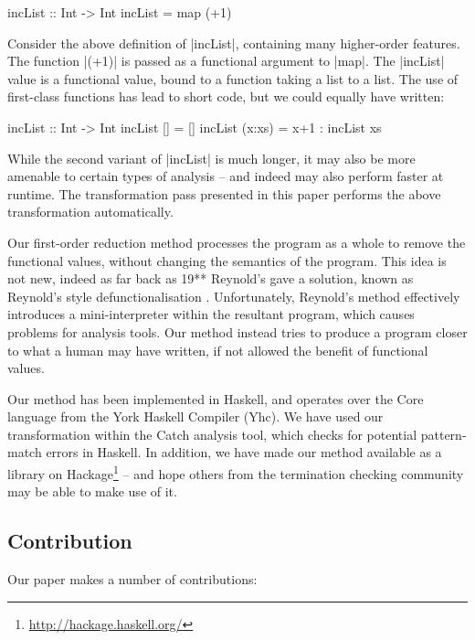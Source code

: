 \documentclass[preprint]{sigplanconf}
\begin{document}
\begin{example}
\label{ex:incList}
\begin{code}
incList :: Int -> Int
incList = map (+1)
\end{code}

Consider the above definition of |incList|, containing many higher-order features. The function |(+1)| is passed as a functional argument to |map|. The |incList| value is a functional value, bound to a function taking a list to a list. The use of first-class functions has lead to short code, but we could equally have written:

\begin{code}
incList :: Int -> Int
incList []      = []
incList (x:xs)  = x+1 : incList xs
\end{code}

While the second variant of |incList| is much longer, it may also be more amenable to certain types of analysis -- and indeed may also perform faster at runtime. The transformation pass presented in this paper performs the above transformation automatically.
\end{example}

Our first-order reduction method processes the program as a whole to remove the functional values, without changing the semantics of the program. This idea is not new, indeed as far back as 19** Reynold's gave a solution, known as Reynold's style defunctionalisation \cite{reynolds:defunctionalisation}. Unfortunately, Reynold's method effectively introduces a mini-interpreter within the resultant program, which causes problems for analysis tools. Our method instead tries to produce a program closer to what a human may have written, if not allowed the benefit of functional values.

Our method has been implemented in Haskell, and operates over the Core language from the York Haskell Compiler (Yhc). We have used our transformation within the Catch analysis tool, which checks for potential pattern-match errors in Haskell. In addition, we have made our method available as a library on Hackage\footnote{\url{http://hackage.haskell.org/}} -- and hope others from the termination checking community may be able to make use of it.

\subsection{Contribution}

Our paper makes a number of contributions:
\end{document}
